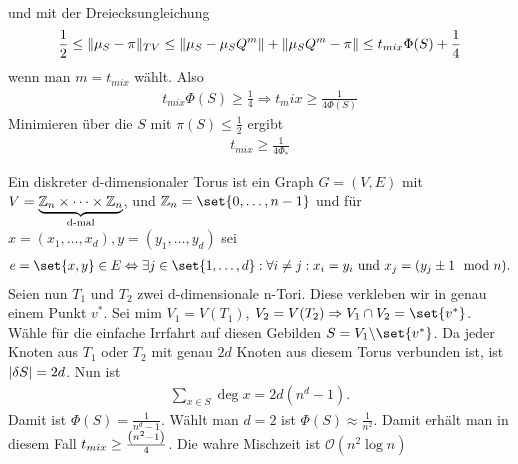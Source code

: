 \begin{beweis}
\begin{align}
 	\end{align}
 	und mit der Dreiecksungleichung 
 	\begin{align}
 		\frac{1}{2} \leq \lVert \mu_S - \pi \rVert_{TV} \leq \lVert \mu_S - \mu_SQ^m \rVert + \lVert \mu_SQ^m-\pi \rVert \leq t_{mix}\Phi(S) + \frac{1}{4}
  	\end{align}
  	wenn man $m = t_{mix}$ wählt. Also
  	\begin{align}
  		t_{mix} \Phi(S) \geq \frac{1}{4} \Rightarrow t_mix \geq \frac{1}{4\Phi(S)}
  	\end{align}
  	Minimieren über die $S$ mit $\pi(S) \leq \frac{1}{2}$ ergibt 
  	\begin{align}
  		t_{mix} \geq \frac{1}{4\Phi_*}
  	\end{align}
\end{beweis}

\begin{beispiel}
	\label{bsp:verklebtte-Tori}
	Ein diskreter d-dimensionaler Torus ist ein Graph $G = (V,E)$ mit $V = \underbrace{\mathbb{Z}_n \times \dots \times \mathbb{Z}_n}_{\text{d-mal}}$, und $\ZZ_n = \set{0,\dots,n-1}$ und für $x = (x_1,\dots,x_d), y = (y_1,\dots,y_d)$ sei 
	\begin{align}
		e = \set{x,y} \in E \Leftrightarrow \exists j \in \set{1,\dots,d} :\forall i \neq j: x_i = y_i  \text{ und } x_j = (y_j \pm 1 \mod{n}).
	\end{align} 
	Seien nun $T_1$ und $T_2$ zwei d-dimensionale n-Tori. Diese verkleben wir in genau einem Punkt $v^*$. Sei mim $V_1 = V(T_1)$, $V_2 = V(T_2) \Rightarrow V_1 \cap V_2 = \set{v^*}$. Wähle für die einfache Irrfahrt auf diesen Gebilden $S = V_1\backslash \set{v^*}$. Da jeder Knoten aus $T_1$ oder $T_2$ mit genau $2d$ Knoten aus diesem Torus verbunden ist, ist $\lvert\delta S\rvert = 2d$. Nun ist 
	\begin{align}
		\sum\limits_{x \in S} \deg{x} = 2d(n^d-1). 
	\end{align}
	Damit ist $\Phi(S) = \frac{1}{n^d - 1}$. Wählt man $d = 2$ ist $\Phi(S) \approx \frac{1}{n^2}$. Damit erhält man in diesem Fall $t_{mix} \geq \frac{\left(n^2-1\right)}{4}$. Die wahre Mischzeit ist $\mathcal{O}(n^2 \log n)$
\end{beispiel}

